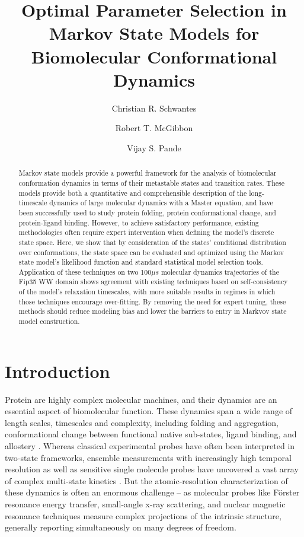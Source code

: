 \documentclass[journal=jpcbfk, layout=twocolumn, manuscript=article]{achemso}
\title{Optimal Parameter Selection in Markov State Models for Biomolecular Conformational Dynamics}
\author{Christian R. Schwantes}
\affiliation{Department of Chemistry, Stanford University, Stanford CA 94305, USA}
\author{Robert T. McGibbon}
\affiliation{Department of Chemistry, Stanford University, Stanford CA 94305, USA}
\author{Vijay S. Pande}
\affiliation{Department of Chemistry, Stanford University, Stanford CA 94305, USA}
\begin{document}
\maketitle
\begin{abstract}
Markov state models provide a powerful framework for the analysis of biomolecular conformation dynamics in terms of their metastable states and transition rates. These models provide both a quantitative and comprehensible description of the long-timescale dynamics of large molecular dynamics with a Master equation, and have been successfully used to study protein folding, protein conformational change, and protein-ligand binding. However, to achieve satisfactory performance, existing methodologies often require expert intervention when defining the model's discrete state space. Here, we show that by consideration of the states' conditional distribution over conformations, the state space can be evaluated and optimized using the Markov state model's likelihood function and standard statistical model selection tools. Application of these techniques on two 100$\mu s$ molecular dynamics trajectories of the Fip35 WW domain shows agreement with existing techniques based on self-consistency of the model's relaxation timescales, with more suitable results in regimes in which those techniques encourage over-fitting. By removing the need for expert tuning, these methods should reduce modeling bias and lower the barriers to entry in Markvov state model construction.
\end{abstract}

\section{Introduction}
Protein are highly complex molecular machines, and their dynamics are an essential aspect of biomolecular function. These dynamics span a wide range of length scales, timescales and complexity, including folding and aggregation, conformational change between functional native sub-states, ligand binding, and allostery \cite{Dobson2003Protein, Kim2008Real, Austin1975Dynamics, Bahar2007Intrinsic}. Whereas classical experimental probes have often been interpreted in two-state frameworks, ensemble measurements with increasingly high temporal resolution as well as sensitive single molecule probes have uncovered a vast array of complex multi-state kinetics \cite{Cosa2006Evidence, Zhang2011Direct}. But the atomic-resolution characterization of these dynamics is often an enormous challenge -- as molecular probes like F\"{o}rster resonance energy transfer, small-angle x-ray scattering, and nuclear magnetic resonance techniques measure complex projections of the intrinsic structure, generally reporting simultaneously on many degrees of freedom\cite{Mertens2010Structural, Tzeng2011Protein}.
\end{document}
